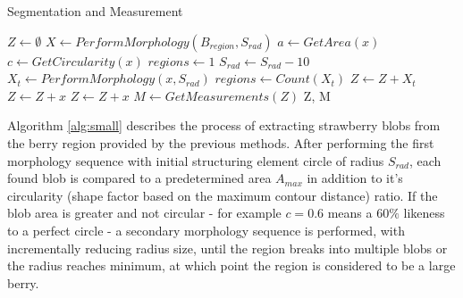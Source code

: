 \documentclass[fleqn,twoside,12pt]{report}
\begin{document}
\begin{algorithm}
	\caption{Segmentation and Measurement}
	\begin{algorithmic}[1]
		\State $Z \gets \emptyset$
		\State $X\gets PerformMorphology(B_{region}, S_{rad})$
			\State $a\gets GetArea(x)$
			\State $c\gets GetCircularity(x)$
				\State $regions \gets 1$
					\State $S_{rad} \gets S_{rad} - 10$
					\State $X_t\gets PerformMorphology(x, S_{rad})$
					\State $regions \gets Count(X_t)$ 
				\EndWhile
					\State $Z \gets Z + X_t$
				\Else
					\State $Z \gets Z + x$
				\EndIf
			\Else 
			\State $Z \gets Z + x$
			\EndIf
		\EndFor
		\State $M \gets GetMeasurements(Z)$ 
		\State \Return Z, M
		\label{alg:small}
		\EndProcedure
	\end{algorithmic}
\end{algorithm}

Algorithm \ref{alg:small} describes the process of extracting strawberry blobs from the berry region provided by the previous methods. After performing the first morphology sequence with initial structuring element circle of radius $S_{rad}$, each found blob is compared to a predetermined area $A_{max}$ in addition to it's circularity (shape factor based on the maximum contour distance) ratio. If the blob area is greater and not circular - for example $c=0.6$ means a $60\%$ likeness to a perfect circle - a secondary morphology sequence is performed, with incrementally reducing radius size, until the region breaks into multiple blobs or the radius reaches minimum, at which point the region is considered to be a large berry.
\end{document}
